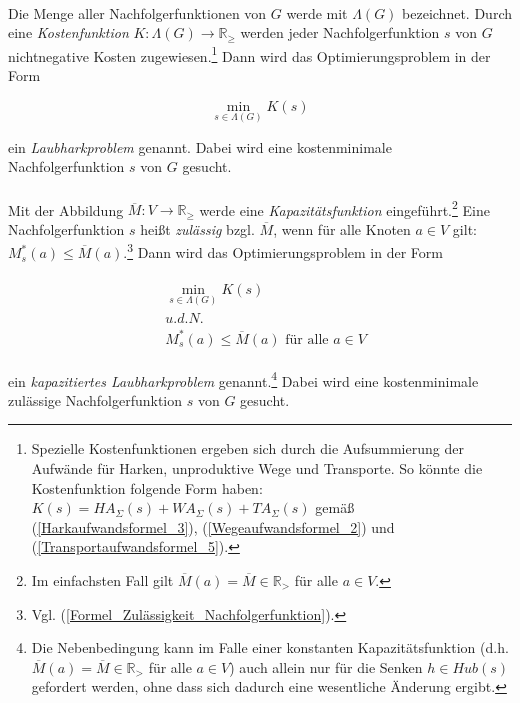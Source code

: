 \documentclass[fontsize=12pt,doubleside,openany,listof=totoc,listof=flat,listof=nochaptergap,numbers=noenddot]{scrbook}
\theoremstyle{style}
\begin{document}
\\
Die Menge aller Nachfolgerfunktionen von $G$ werde mit $\Lambda(G)$\label{Lambda} bezeichnet. Durch eine \textit{Kostenfunktion}\label{Kostenfunktion} $K:\Lambda(G) \rightarrow \mathbb{R}_\geq$ werden jeder Nachfolgerfunktion $s$ von $G$ nichtnegative Kosten zugewiesen.\footnote{Spezielle Kostenfunktionen ergeben sich durch die Aufsummierung der Aufwände für Harken, unproduktive Wege und Transporte. So könnte die Kostenfunktion folgende Form haben: $K(s) = HA_\Sigma(s)+WA_\Sigma(s)+TA_\Sigma(s)$ gemäß (\ref{Harkaufwandsformel_3}), (\ref{Wegeaufwandsformel_2}) und (\ref{Transportaufwandsformel_5}).} Dann wird das Optimierungsproblem in der Form 

\begin{equation}
\min\limits_{s \in \Lambda(G)} K(s)
\label{definition_Laubharkproblem}
\end{equation} 

\noindent ein \textit{Laubharkproblem} genannt. Dabei wird eine kostenminimale Nachfolgerfunktion $s$ von $G$ gesucht.\\
\\
Mit der Abbildung $\overline{M}:V \rightarrow \mathbb{R}_\geq$ werde eine \textit{Kapazitätsfunktion} eingeführt.\footnote{Im einfachsten Fall gilt $\overline{M}(a)=\overline{M} \in \mathbb{R}_>$ für alle $a \in V$.} Eine Nachfolgerfunktion $s$ heißt \textit{zulässig} bzgl. $\overline{M}$, wenn für alle Knoten $a \in V$ gilt: $M^*_s(a) \leq \overline{M}(a)$.\footnote{Vgl. (\ref{Formel_Zulässigkeit_Nachfolgerfunktion}).} Dann wird das Optimierungsproblem in der Form 

\begin{align}
\begin{split}
&\min\limits_{s \in \Lambda(G)} K(s)\\ &u.d.N. \\ &M^*_s(a) \leq \overline{M}(a) \text{ für alle } a \in V
\label{definition_kapazitiertes_Laubharkproblem}
\end{split}
\end{align} 

\noindent ein \textit{kapazitiertes Laubharkproblem} genannt.\footnote{Die Nebenbedingung kann im Falle einer konstanten Kapazitätsfunktion (d.h. $\overline{M}(a)=\overline{M} \in \mathbb{R}_>$ für alle $a \in V$) auch allein nur für die Senken $h \in Hub(s)$ gefordert werden, ohne dass sich dadurch eine wesentliche Änderung ergibt.} Dabei wird eine kostenminimale zulässige Nachfolgerfunktion $s$ von $G$ gesucht.
\end{document}
